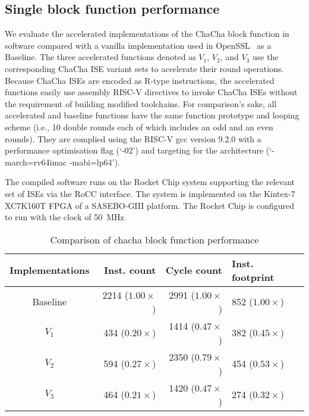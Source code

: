 
\subsection{Single block function performance}
\label{sec:eval:blk}
We evaluate the accelerated implementations of the ChaCha block function in software compared with a vanilla implementation used in OpenSSL~\cite{OpenSSL} as a Baseline. The three accelerated functions denoted as $V_1$, $V_2$, and $V_3$ use the corresponding ChaCha ISE variant sets to accelerate their round operations. 
Because ChaCha ISEs are encoded as R-type instructions, the accelerated functions easily use assembly RISC-V directives  to invoke ChaCha ISEs without the requirement of building modified toolchains.   
For comparison's sake, all accelerated and baseline functions have the same function prototype and looping scheme (i.e., 10 double rounds each of which includes an odd and an even rounds). 
They are complied using the RISC-V gcc version 9.2.0 with a performance optimisation flag (`-02') and targeting for the  architecture (`-march=rv64imac -mabi=lp64'). 

The compiled software runs on the Rocket Chip system supporting the relevant set of ISEs via the RoCC interface.
The system is implemented on the Kintex-7 XC7K160T FPGA of a SASEBO-GIII platform.
The Rocket Chip is configured to run with the clock of 50~MHz.


\begin{table}[b]
\caption{Comparison of chacha block function performance}
\centering
\label{tab:res:sw:perf1}
\begin{tabular}{crrl}
\toprule            
Implementations        & Inst. count   & Cycle count & Inst. footprint\\

\midrule
Baseline & 2214 ($1.00\times$)     & 2991 ($1.00\times$) &  852 ($1.00\times$)\\
 $V_1$   &  434 ($0.20\times$)     & 1414 ($0.47\times$) &  382 ($0.45\times$)\\
 $V_2$   &  594 ($0.27\times$)     & 2350 ($0.79\times$) &  454 ($0.53\times$)\\
 $V_3$   &  464 ($0.21\times$)     & 1420 ($0.47\times$) &  274 ($0.32\times$)\\

\bottomrule
\end{tabular}
\end{table}

